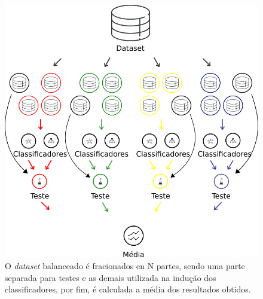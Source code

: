 \begin{figure}[H]
\begin{center}
    \includegraphics[scale=0.50]{images/metodologia_4.png}
\end{center}
\caption{O \textit{dataset} balanceado é fracionados en N partes, sendo uma 
parte separada para testes e as demais utilizada na indução dos classificadores, 
por fim, é calculada a média dos resultados obtidos.}
\label{figure:metodologia_4}
\end{figure}